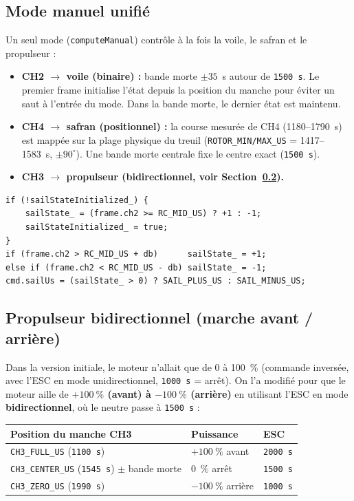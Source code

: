 \documentclass[12pt,a4paper]{article}
\newcommand{\us}[1]{\texttt{#1\,\textmu s}}
\begin{document}
\subsection{Mode manuel unifi\'e}

Un seul mode (\texttt{computeManual}) contr\^ole à la fois la voile, le safran et le
propulseur :

\begin{itemize}
  \item \textbf{CH2 $\to$ voile (binaire) :} bande morte $\pm35$~\textmu s autour de
    \us{1500}. Le premier frame initialise l'\'etat depuis la position du manche pour
    \'eviter un saut à l'entr\'ee du mode. Dans la bande morte, le dernier \'etat est
    maintenu.
  \item \textbf{CH4 $\to$ safran (positionnel) :} la course mesur\'ee de CH4
    (1180--1790~\textmu s) est mapp\'ee sur la plage physique du treuil
    (\texttt{ROTOR\_MIN/MAX\_US} = 1417--1583~\textmu s, $\pm90^{\circ}$). Une bande
    morte centrale fixe le centre exact (\us{1500}).
  \item \textbf{CH3 $\to$ propulseur (bidirectionnel, voir Section~\ref{sec:bidir}).}
\end{itemize}

\begin{lstlisting}[style=cpp, caption={ManualController -- logique de voile binaire avec etat memorise}]
if (!sailStateInitialized_) {
    sailState_ = (frame.ch2 >= RC_MID_US) ? +1 : -1;
    sailStateInitialized_ = true;
}
if (frame.ch2 > RC_MID_US + db)      sailState_ = +1;
else if (frame.ch2 < RC_MID_US - db) sailState_ = -1;
cmd.sailUs = (sailState_ > 0) ? SAIL_PLUS_US : SAIL_MINUS_US;
\end{lstlisting}

\subsection{Propulseur bidirectionnel (marche avant / arri\`ere)}
\label{sec:bidir}

Dans la version initiale, le moteur n'allait que de 0 à 100~\% (commande invers\'ee,
avec l'ESC en mode unidirectionnel, \us{1000} = arr\^et). On l'a modifi\'e pour que
le moteur aille de \textbf{$+100~\%$ (avant) à $-100~\%$ (arri\`ere)} en utilisant
l'ESC en mode \textbf{bidirectionnel}, o\`u le neutre passe à \us{1500} :

\begin{longtable}{C{4.5cm} C{3cm} L{5cm}}
  \toprule
  \textcolor{tableheadfg}{\textbf{Position du manche CH3}} &
  \textcolor{tableheadfg}{\textbf{Puissance}} &
  \textcolor{tableheadfg}{\textbf{ESC}} \\
  \midrule
  \endhead
  \bottomrule
  \endfoot
  \texttt{CH3\_FULL\_US} (\us{1100}) & $+100~\%$ avant & \us{2000} \\[3pt]
  \texttt{CH3\_CENTER\_US} (\us{1545}) $\pm$ bande morte & 0~\% arr\^et & \us{1500} \\[3pt]
  \texttt{CH3\_ZERO\_US} (\us{1990}) & $-100~\%$ arri\`ere & \us{1000} \\
\end{longtable}
\end{document}
